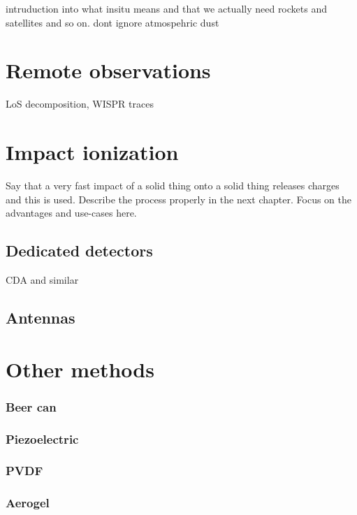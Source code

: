 intruduction into what insitu means and that we actually need rockets and satellites and so on. dont ignore atmospehric dust

\section{Remote observations}

LoS decomposition, WISPR traces

\section{Impact ionization}

Say that a very fast impact of a solid thing onto a solid thing releases charges and this is used. Describe the process properly in the next chapter. Focus on the advantages and use-cases here.

\subsection{Dedicated detectors}

CDA and similar

\subsection{Antennas}

\section{Other methods}

\subsubsection{Beer can}

\subsubsection{Piezoelectric}

\subsubsection{PVDF}

\subsubsection{Aerogel}
